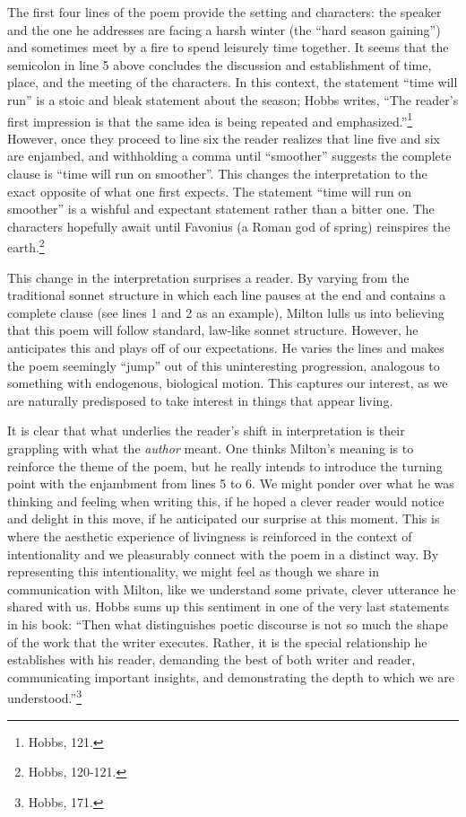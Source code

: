 The first four lines of the poem provide the setting and characters: the
speaker and the one he addresses are facing a harsh winter (the ``hard
season gaining'') and sometimes meet by a fire to spend leisurely time
together. It seems that the semicolon in line 5 above concludes the
discussion and establishment of time, place, and the meeting of the
characters. In this context, the statement ``time will run'' is a stoic
and bleak statement about the season; Hobbs writes, ``The reader's first
impression is that the same idea is being repeated and
emphasized.''\footnote{Hobbs, 121.} However, once they proceed to line
six the reader realizes that line five and six are enjambed, and
withholding a comma until ``smoother'' suggests the complete clause is
``time will run on smoother''. This changes the interpretation to the
exact opposite of what one first expects. The statement ``time will run
on smoother'' is a wishful and expectant statement rather than a bitter
one. The characters hopefully await until Favonius (a Roman god of
spring) reinspires the earth.\footnote{Hobbs, 120-121.}

This change in the interpretation surprises a reader. By varying from
the traditional sonnet structure in which each line pauses at the end
and contains a complete clause (see lines 1 and 2 as an example), Milton
lulls us into believing that this poem will follow standard, law-like
sonnet structure. However, he anticipates this and plays off of our
expectations. He varies the lines and makes the poem seemingly ``jump''
out of this uninteresting progression, analogous to something with
endogenous, biological motion. This captures our interest, as we are
naturally predisposed to take interest in things that appear living.

It is clear that what underlies the reader's shift in interpretation is
their grappling with what the \emph{author} meant. One thinks Milton's
meaning is to reinforce the theme of the poem, but he really intends to
introduce the turning point with the enjambment from lines 5 to 6. We
might ponder over what he was thinking and feeling when writing this, if
he hoped a clever reader would notice and delight in this move, if he
anticipated our surprise at this moment. This is where the aesthetic
experience of livingness is reinforced in the context of intentionality
and we pleasurably connect with the poem in a distinct way. By
representing this intentionality, we might feel as though we share in
communication with Milton, like we understand some private, clever
utterance he shared with us. Hobbs sums up this sentiment in one of the
very last statements in his book: ``Then what distinguishes poetic
discourse is not so much the shape of the work that the writer executes.
Rather, it is the special relationship he establishes with his reader,
demanding the best of both writer and reader, communicating important
insights, and demonstrating the depth to which we are
understood.''\footnote{Hobbs, 171.}

